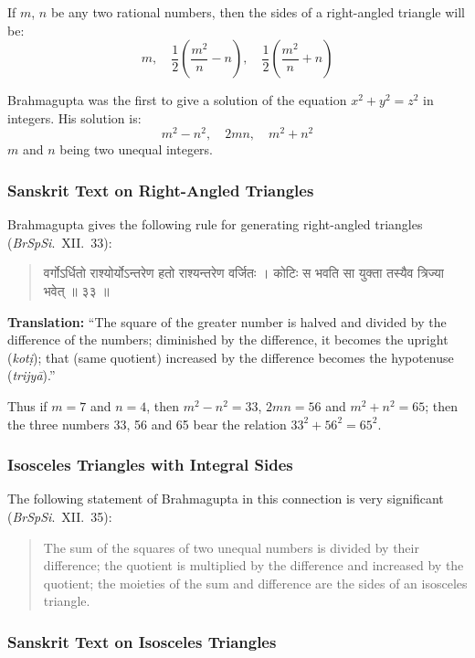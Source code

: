 \documentclass[11pt,a4paper]{article}
\newcommand{\dev}[1]{{\devanagarifont #1}}
\newenvironment{sanskritverse}{%
  \begin{quote}
  \devanagarifont
  \small
  \color{titlecolor}
}{\end{quote}}
\theoremstyle{definition}
\begin{document}
If $m$, $n$ be any two rational numbers, then the sides of a right-angled triangle will be:
\[
m, \quad \frac{1}{2}\left(\frac{m^2}{n} - n\right), \quad \frac{1}{2}\left(\frac{m^2}{n} + n\right)
\]

Brahmagupta was the first to give a solution of the equation $x^2 + y^2 = z^2$ in integers. His solution is:
\[
m^2 - n^2, \quad 2mn, \quad m^2 + n^2
\]
$m$ and $n$ being two unequal integers.


\subsubsection{Sanskrit Text on Right-Angled Triangles}

Brahmagupta gives the following rule for generating right-angled triangles (\textit{BrSpSi}.\ XII.\ 33):

\begin{sanskritverse}
\dev{वर्गोऽर्धितो राश्योर्योऽन्तरेण हतो राश्यन्तरेण वर्जितः ।}
\dev{कोटिः स भवति सा युक्ता तस्यैव त्रिज्या भवेत् ॥ ३३ ॥}
\end{sanskritverse}

\textbf{Translation:} ``The square of the greater number is halved and divided by the difference of the numbers; diminished by the difference, it becomes the upright (\textit{kot\d{i}}); that (same quotient) increased by the difference becomes the hypotenuse (\textit{trijy\=a}).''

\vspace{0.3cm}
Thus if $m = 7$ and $n = 4$, then $m^2 - n^2 = 33$, $2mn = 56$ and $m^2 + n^2 = 65$; then the three numbers 33, 56 and 65 bear the relation $33^2 + 56^2 = 65^2$.

\subsubsection{Isosceles Triangles with Integral Sides}

The following statement of Brahmagupta in this connection is very significant (\textit{BrSpSi}.\ XII.\ 35):
\begin{quote}
The sum of the squares of two unequal numbers is divided by their difference; the quotient is multiplied by the difference and increased by the quotient; the moieties of the sum and difference are the sides of an isosceles triangle.
\end{quote}

\subsubsection{Sanskrit Text on Isosceles Triangles}
\end{document}
